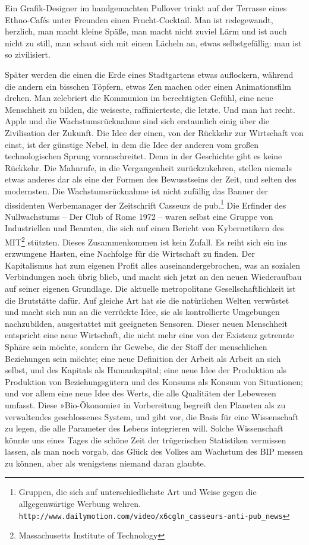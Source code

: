 \extrapar{}

Ein Grafik-Designer im handgemachten Pullover trinkt auf der
Terrasse eines Ethno-Cafés unter Freunden einen Frucht-Cocktail.
Man ist redegewandt, herzlich, man macht kleine Späße, man macht
nicht zuviel Lärm und ist auch nicht zu still, man schaut sich mit
einem Lächeln an, etwas selbstgefällig: man ist so zivilisiert.
\extrapar{}

Später werden die einen die Erde eines Stadtgartens etwas
auflockern, während die andern ein bisschen Töpfern, etwas Zen
machen oder einen Animationsfilm drehen. Man zelebriert die
Kommunion im berechtigten Gefühl, eine neue Menschheit zu bilden,
die weiseste, raffinierteste, die letzte. Und man hat recht. Apple
und die Wachstumsrücknahme sind sich erstaunlich einig über die
Zivilisation der Zukunft. Die Idee der einen, von der Rückkehr zur
Wirtschaft von einst, ist der günstige Nebel, in dem die Idee der
anderen vom großen technologischen Sprung voranschreitet. Denn in
der Geschichte gibt es keine Rückkehr. Die Mahnrufe, in die
Vergangenheit zurückzukehren, stellen niemals etwas anderes dar als
eine der Formen des Bewusstseins der Zeit, und selten des
modernsten. Die Wachstumsrücknahme ist nicht zufällig das Banner
der dissidenten Werbemanager der Zeitschrift Casseurs de pub.\footnote{
Gruppen, die sich auf unterschiedlichste Art und Weise gegen die
allgegenwärtige Werbung wehren.\\
\texttt{http://www.dailymotion.com/video/x6cgln\_casseurs-anti-pub\_news}
}
Die
Erfinder des Nullwachstums – Der Club of Rome 1972 – waren selbst
eine Gruppe von Industriellen und Beamten, die sich auf einen
Bericht von Kybernetikern des MIT\footnote{
Massachusetts Institute of Technology
}
stützten.
Dieses Zusammenkommen ist kein Zufall. Es reiht sich ein ins
erzwungene Hasten, eine Nachfolge für die Wirtschaft zu finden. Der
Kapitalismus hat zum eigenen Profit alles auseinandergebrochen, was
an sozialen Verbindungen noch übrig blieb, und macht sich jetzt an
den neuen Wiederaufbau auf seiner eigenen Grundlage. Die aktuelle
metropolitane Gesellschaftlichkeit ist die Brutstätte dafür. Auf
gleiche Art hat sie die natürlichen Welten verwüstet und macht sich
nun an die verrückte Idee, sie als kontrollierte Umgebungen
nachzubilden, ausgestattet mit geeigneten Sensoren. Dieser neuen
Menschheit entspricht eine neue Wirtschaft, die nicht mehr eine von
der Existenz getrennte Sphäre sein möchte, sondern ihr Gewebe, die
der Stoff der menschlichen Beziehungen sein möchte; eine neue
Definition der Arbeit als Arbeit an sich selbst, und des Kapitals
als Humankapital; eine neue Idee der Produktion als Produktion von
Beziehungsgütern und des Konsums als Konsum von Situationen; und
vor allem eine neue Idee des Werts, die alle Qualitäten der
Lebewesen umfasst. Diese »Bio-Ökonomie« in Vorbereitung begreift
den Planeten als zu verwaltendes geschlossenes System, und gibt
vor, die Basis für eine Wissenschaft zu legen, die alle Parameter
des Lebens integrieren will. Solche Wissenschaft könnte uns eines
Tages die schöne Zeit der trügerischen Statistiken vermissen
lassen, als man noch vorgab, das Glück des Volkes am Wachstum des
BIP messen zu können, aber als wenigstens niemand daran glaubte.

